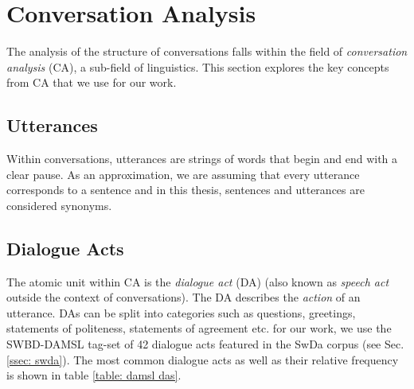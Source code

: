 \section{Conversation Analysis \label{sec: ca}}

The analysis of the structure of conversations falls within the field of \textit{conversation analysis} (CA), a sub-field of linguistics. This section explores the key concepts from CA that we use for our work. 
    \subsection{Utterances \label{ssec: utterances}}
        Within conversations, utterances are strings of words that begin and end with a clear pause. As an approximation, we are assuming that every utterance corresponds to a sentence and in this thesis, sentences and utterances are considered synonyms.
    \subsection{Dialogue Acts \label{ssec: DAs}}
        The atomic unit within CA is the \textit{dialogue act} (DA) (also known as \textit{speech act} outside the context of conversations). The DA describes the \textit{action} of an utterance. DAs can be split into categories such as questions, greetings, statements of politeness, statements of agreement etc. for our work, we use the SWBD-DAMSL tag-set of 42 dialogue acts featured in the SwDa corpus (see Sec. \ref{ssec: swda})\cite{fang2012annotation, swda}. The most common dialogue acts as well as their relative frequency is shown in table \ref{table: damsl das}.
        
